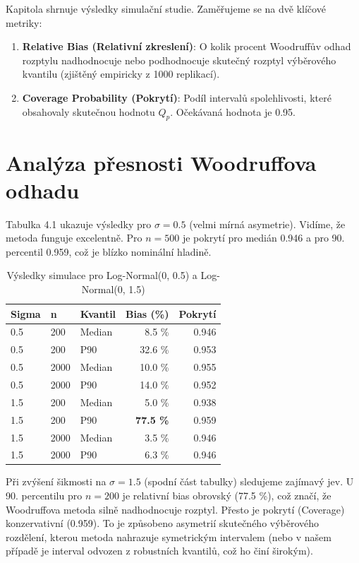 Kapitola shrnuje výsledky simulační studie. Zaměřujeme se na dvě klíčové metriky:
\begin{enumerate}
    \item \textbf{Relative Bias (Relativní zkreslení)}: O kolik procent Woodruffův odhad rozptylu nadhodnocuje nebo podhodnocuje skutečný rozptyl výběrového kvantilu (zjištěný empiricky z 1000 replikací).
    \item \textbf{Coverage Probability (Pokrytí)}: Podíl intervalů spolehlivosti, které obsahovaly skutečnou hodnotu $Q_p$. Očekávaná hodnota je 0.95.
\end{enumerate}

\section{Analýza přesnosti Woodruffova odhadu}

Tabulka 4.1 ukazuje výsledky pro $\sigma=0.5$ (velmi mírná asymetrie). Vidíme, že metoda funguje excelentně. Pro $n=500$ je pokrytí pro medián 0.946 a pro 90. percentil 0.959, což je blízko nominální hladině.

\begin{table}[h]
\centering
\caption{Výsledky simulace pro Log-Normal(0, 0.5) a Log-Normal(0, 1.5)}
\begin{tabular}{|l|l|l|r|r|}
\hline
\textbf{Sigma} & \textbf{n} & \textbf{Kvantil} & \textbf{Bias (\%)} & \textbf{Pokrytí} \\ \hline
0.5 & 200 & Median & 8.5 \% & 0.946 \\
0.5 & 200 & P90 & 32.6 \% & 0.953 \\
0.5 & 2000 & Median & 10.0 \% & 0.955 \\
0.5 & 2000 & P90 & 14.0 \% & 0.952 \\ \hline
1.5 & 200 & Median & 5.0 \% & 0.938 \\
1.5 & 200 & P90 & \textbf{77.5 \%} & 0.959 \\
1.5 & 2000 & Median & 3.5 \% & 0.946 \\
1.5 & 2000 & P90 & 6.3 \% & 0.946 \\ \hline
\end{tabular}
\end{table}

Při zvýšení šikmosti na $\sigma=1.5$ (spodní část tabulky) sledujeme zajímavý jev.
U 90. percentilu pro $n=200$ je relativní bias obrovský (77.5 \%), což značí, že Woodruffova metoda silně nadhodnocuje rozptyl. Přesto je pokrytí (Coverage) konzervativní (0.959). To je způsobeno asymetrií skutečného výběrového rozdělení, kterou metoda nahrazuje symetrickým intervalem (nebo v našem případě je interval odvozen z robustních kvantilů, což ho činí širokým).

